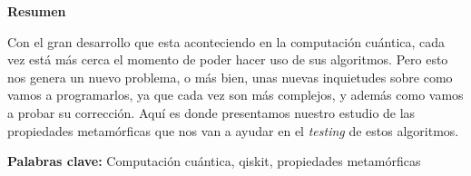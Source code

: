\newpage

\thispagestyle{empty}

\begin{center}

{\bf \Huge Resumen}

  \end{center}
\vspace{1cm}

 Con el gran desarrollo que esta aconteciendo en la computación cuántica, cada vez está más cerca el momento de poder hacer uso de sus algoritmos. Pero esto nos genera un nuevo problema, o más bien, unas nuevas inquietudes sobre como vamos a programarlos, ya que cada vez son más complejos, y además como vamos a probar su corrección. Aquí es donde presentamos nuestro estudio de las propiedades metamórficas que nos van a ayudar en el \textit{testing} de estos algoritmos.

\vspace{2cm}



\textbf{Palabras clave:} Computación cuántica, qiskit, propiedades metamórficas
   
   
   